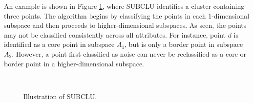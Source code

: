 An example is shown in Figure \ref{fig:subclu}, where SUBCLU identifies a cluster containing three points. The algorithm begins by classifying the points in each 1-dimensional subspace and then proceeds to higher-dimensional subspaces. As seen, the points may not be classified consistently across all attributes. For instance, point $d$ is identified as a core point in subspace $A_1$, but is only a border point in subspace $A_2$. However, a point first classified as noise can never be reclassified as a core or border point in a higher-dimensional subspace.
\begin{figure}[H]
    \vspace*{-0.7cm}
    \centering
    ~~~~
    ~
    \caption{Illustration of SUBCLU.}
    \label{fig:subclu}
    \vspace*{-0.7cm}
\end{figure}